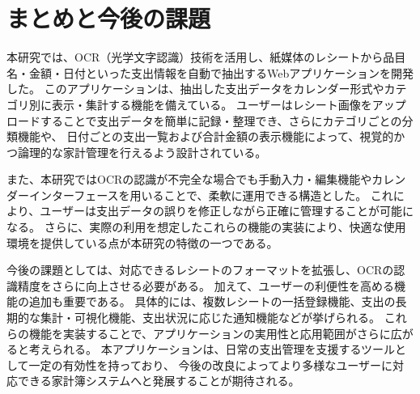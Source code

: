 \documentclass[main]{subfiles}
\begin{document}
\chapter{まとめと今後の課題}
\label{cha:conclusion}
本研究では、OCR（光学文字認識）技術を活用し、紙媒体のレシートから品目名・金額・日付といった支出情報を自動で抽出するWebアプリケーションを開発した。
このアプリケーションは、抽出した支出データをカレンダー形式やカテゴリ別に表示・集計する機能を備えている。
ユーザーはレシート画像をアップロードすることで支出データを簡単に記録・整理でき、さらにカテゴリごとの分類機能や、
日付ごとの支出一覧および合計金額の表示機能によって、視覚的かつ論理的な家計管理を行えるよう設計されている。

また、本研究ではOCRの認識が不完全な場合でも手動入力・編集機能やカレンダーインターフェースを用いることで、柔軟に運用できる構造とした。
これにより、ユーザーは支出データの誤りを修正しながら正確に管理することが可能になる。
さらに、実際の利用を想定したこれらの機能の実装により、快適な使用環境を提供している点が本研究の特徴の一つである。

今後の課題としては、対応できるレシートのフォーマットを拡張し、OCRの認識精度をさらに向上させる必要がある。
加えて、ユーザーの利便性を高める機能の追加も重要である。
具体的には、複数レシートの一括登録機能、支出の長期的な集計・可視化機能、支出状況に応じた通知機能などが挙げられる。
これらの機能を実装することで、アプリケーションの実用性と応用範囲がさらに広がると考えられる。
本アプリケーションは、日常の支出管理を支援するツールとして一定の有効性を持っており、
今後の改良によってより多様なユーザーに対応できる家計簿システムへと発展することが期待される。
\end{document}
